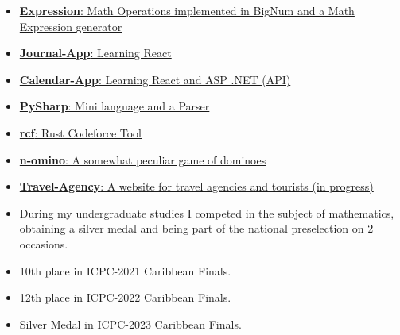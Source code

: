 \documentclass[9pt]{developercv} %
\begin{document}
\begin{minipage}[t]{0.45\textwidth}
	\vspace{-\baselineskip} %


	\begin{itemize}
		\item {\href{https://github.com/raudel25/Expression}{\textbf{Expression}: Math Operations implemented in BigNum and a Math Expression generator}}
		\item {\href{https://github.com/raudel25/Journal-App}{\textbf{Journal-App}: Learning React}}
		\item {\href{https://github.com/raudel25/Calendar-App}{\textbf{Calendar-App}: Learning React and ASP .NET (API)}}
		\item {\href{https://github.com/raudel25/PySharp}{\textbf{PySharp}: Mini language and a Parser}}
		\item {\href{https://github.com/raudel25/rcf}{\textbf{rcf}: Rust Codeforce Tool}}
		\item {\href{https://github.com/raudel25/n-omino}{\textbf{n-omino}: A somewhat peculiar game of dominoes}}
		\item {\href{https://github.com/Jara-Devs/Travel-Agency}{\textbf{Travel-Agency}: A website for travel agencies and tourists (in progress)}}
	\end{itemize}
\end{minipage}
\hfill
\begin{minipage}[t]{0.45\textwidth}
	\vspace{-\baselineskip} %


	\begin{itemize}
		\item During my undergraduate studies I competed in the subject of mathematics, obtaining a
		      silver medal and being part of the national preselection on 2 occasions.
		\item 10th place in ICPC-2021 Caribbean Finals.
		\item 12th place in ICPC-2022 Caribbean Finals.
		\item Silver Medal in ICPC-2023 Caribbean Finals.
	\end{itemize}

\end{minipage}



\end{document}
